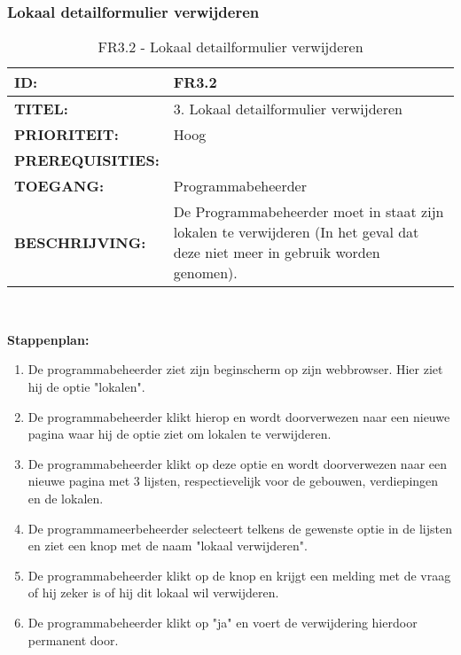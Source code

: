 \subsubsection{Lokaal detailformulier verwijderen}        
\noindent\begin{table}[H]
            \begin{tabular}{l | p{10cm}}
                \textbf{ID:} & FR3.2 \\ \hline
                \textbf{TITEL:} & 3. Lokaal detailformulier verwijderen\\ \hline
                \textbf{PRIORITEIT:} &  Hoog \\ \hline
                \textbf{PREREQUISITIES:} & \\ \hline
                \textbf{TOEGANG:} & Programmabeheerder \\ \hline
                \textbf{BESCHRIJVING:} & De Programmabeheerder moet in staat zijn lokalen te verwijderen (In het geval dat deze niet meer in gebruik worden genomen).\\ 
            \end{tabular}\\
            \caption{FR3.2 - Lokaal detailformulier verwijderen}
            \label{tab:FR3.2- Lokaal detailformulier verwijderen}
        \end{table}
        
\textbf{Stappenplan:}       
\begin{enumerate}
\item De programmabeheerder ziet zijn beginscherm op zijn webbrowser. Hier ziet hij de optie "lokalen".
\item De programmabeheerder klikt hierop en wordt doorverwezen naar een nieuwe pagina waar hij de optie ziet om lokalen te verwijderen.
\item De programmabeheerder klikt op deze optie en wordt doorverwezen naar een nieuwe pagina met 3 lijsten, respectievelijk voor de gebouwen, verdiepingen en de lokalen.
\item De programmameerbeheerder selecteert telkens de gewenste optie in de lijsten en ziet een knop met de naam "lokaal verwijderen".
\item De programmabeheerder klikt op de knop en krijgt een melding met de vraag of hij zeker is of hij dit lokaal wil verwijderen.
\item De programmabeheerder klikt op "ja" en voert de verwijdering hierdoor permanent door.
\end{enumerate}      

